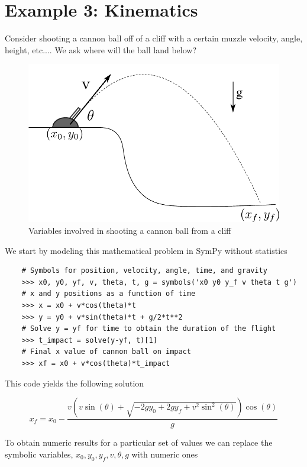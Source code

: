 \section{Example 3: Kinematics}

Consider shooting a cannon ball off of a cliff with a certain muzzle velocity, angle, height, etc.... We ask where will the ball land below?

\begin{figure}[ht]
\vspace{-0pt}
\centering
\includegraphics[width=.55\textwidth]{images/kinematics}
\vspace{-0pt}
\caption{Variables involved in shooting a cannon ball from a cliff}
\label{fig:kinematics}
\vspace{00pt}
\end{figure}
We start by modeling this mathematical problem in SymPy without statistics

\begin{lstlisting}
    # Symbols for position, velocity, angle, time, and gravity
    >>> x0, y0, yf, v, theta, t, g = symbols('x0 y0 y_f v theta t g') 
    # x and y positions as a function of time
    >>> x = x0 + v*cos(theta)*t
    >>> y = y0 + v*sin(theta)*t + g/2*t**2
    # Solve y = yf for time to obtain the duration of the flight
    >>> t_impact = solve(y-yf, t)[1]
    # Final x value of cannon ball on impact
    >>> xf = x0 + v*cos(theta)*t_impact
\end{lstlisting}
This code yields the following solution

\begin{equation}
\label{eqn:kinematics_symbolic}
x_f = x_{0} - \frac{v \left(v \sin{\left (\theta \right )} + \sqrt{- 2 g y_{0} + 2 g y_f + v^{2} \sin^{2}{\left (\theta \right )}}\right) \cos{\left (\theta \right )}}{g}
\end{equation}

To obtain numeric results for a particular set of values we can replace the symbolic variables, $x_0, y_0, y_f, v, \theta, g$ with numeric ones

